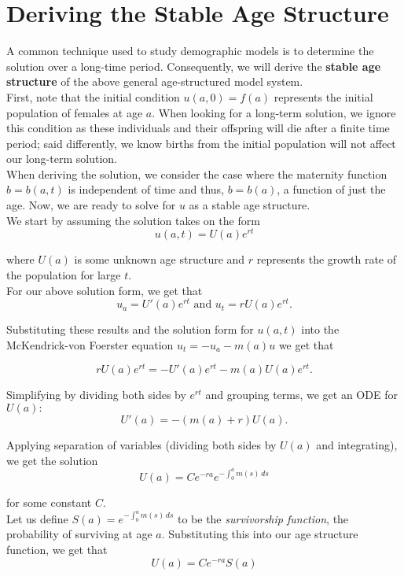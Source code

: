 \section{Deriving the Stable Age Structure}
A common technique used to study demographic models is to determine the solution over a long-time period. Consequently, we will derive the \textbf{stable age structure} of the above general age-structured model system. \\

First, note that the initial condition $u(a, 0) = f(a)$ represents the initial population of females at age $a$. When looking for a long-term solution, we ignore this condition as these individuals and their offspring will die after a finite time period; said differently, we know births from the initial population will not affect our long-term solution. \\

When deriving the solution, we consider the case where the maternity function $b = b(a,t)$ is independent of time and thus, $b = b(a)$, a function of just the age. Now, we are ready to solve for $u$ as a stable age structure.  \\

We start by assuming the solution takes on the form \[ u(a, t) = U(a)e^{rt}\]

where $U(a)$ is some unknown age structure and $r$ represents the growth rate of the population for large $t$. \\

For our above solution form, we get that
\[ u_a = U'(a)e^{rt} \text{ and } u_t = rU(a)e^{rt}.\]

Substituting these results and the solution form for $u(a, t)$ into the McKendrick-von Foerster equation $u_t = -u_a - m(a)u$ we get that

\[ rU(a)e^{rt} = -U'(a)e^{rt} - m(a)U(a)e^{rt}.\]

Simplifying by dividing both sides by $e^{rt}$ and grouping terms, we get an ODE for $U(a):$
\[ U'(a) = -(m(a) + r)U(a).\]

Applying separation of variables (dividing both sides by $U(a)$ and integrating), we get the solution 
\[ U(a) = Ce^{-ra}e^{-\int_0^a m(s) \, ds}\]

for some constant $C$. \\

Let us define $S(a) = e^{-\int_0^a m(s) \, ds}$ to be the \textit{survivorship function}, the probability of surviving at age $a$. Substituting this into our age structure function, we get that \[U(a) = Ce^{-ra}S(a)\]

